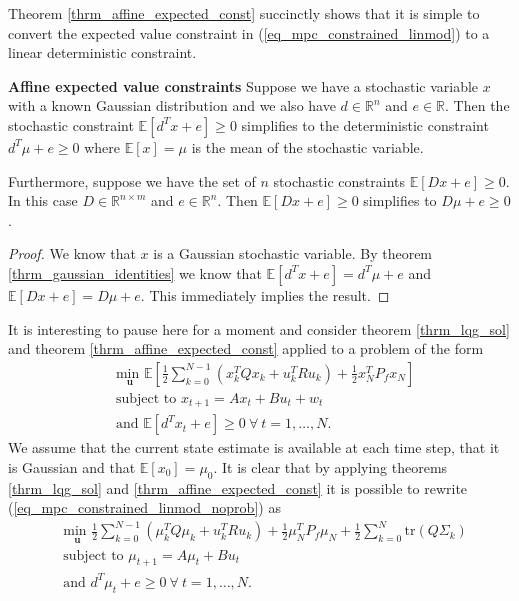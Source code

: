 Theorem \ref{thrm_affine_expected_const} succinctly shows that it is simple to convert the expected value constraint in (\ref{eq_mpc_constrained_linmod}) to a linear deterministic constraint.
\begin{thrm}
\textbf{Affine expected value constraints} Suppose we have a stochastic variable $x$ with a known Gaussian distribution and we also have $d \in \mathbb{R}^{n}$ and $e \in \mathbb{R}$. Then the stochastic constraint $\mathbb{E}[d^Tx + e] \geq 0$ simplifies to the deterministic constraint $d^T\mu + e \geq 0$ where $\mathbb{E}[x]= \mu$ is the mean of the stochastic variable. 

Furthermore, suppose we have the set of $n$ stochastic constraints $\mathbb{E}[Dx + e] \geq 0$. In this case $D \in \mathbb{R}^{n \times m}$ and $e \in \mathbb{R}^n$. Then $\mathbb{E}[Dx + e] \geq 0$ simplifies to $D\mu + e \geq 0$.  
\label{thrm_affine_expected_const}
\end{thrm}
\begin{proof}
We know that $x$ is a Gaussian stochastic variable. By theorem \ref{thrm_gaussian_identities} we know that $\mathbb{E}[d^Tx + e] =d^T\mu + e$ and $\mathbb{E}[Dx + e] = D\mu + e$. This immediately implies the result.
\end{proof}
It is interesting to pause here for a moment and consider theorem \ref{thrm_lqg_sol} and theorem \ref{thrm_affine_expected_const} applied to a problem of the form 
\begin{equation}
\begin{aligned}
&\underset{\mathbf{u}}{\text{min }} \mathbb{E}\left[ \frac{1}{2}\sum_{k=0}^{N-1} \left( x_k^TQx_k + u_k^TRu_k \right) + \frac{1}{2}x_N^TP_fx_N \right] \\
& \text{subject to } x_{t+1}=Ax_t+Bu_t + w_t \\
& \text{and } \mathbb{E}[d^Tx_t + e] \geq 0 ~\forall ~t=1,\hdots,N.
\end{aligned}
\label{eq_mpc_constrained_linmod_noprob}
\end{equation}
We assume that the current state estimate is available at each time step, that it is Gaussian and that $\mathbb{E}[x_0]=\mu_0$. It is clear that by applying theorems \ref{thrm_lqg_sol} and \ref{thrm_affine_expected_const} it is possible to rewrite (\ref{eq_mpc_constrained_linmod_noprob}) as
\begin{equation}
\begin{aligned}
&\underset{\mathbf{u}}{\text{min }} \frac{1}{2}\sum_{k=0}^{N-1} \left( \mu_k^TQ\mu_k + u_k^TRu_k \right) + \frac{1}{2}\mu_N^TP_f\mu_N + \frac{1}{2}\sum_{k=0}^N \text{tr}(Q\Sigma_k) \\
& \text{subject to } \mu_{t+1}=A\mu_t + Bu_t \\
& \text{and } d^T\mu_t + e \geq 0 ~\forall ~t=1,\hdots,N.
\end{aligned}
\label{eq_mpc_constrained_linmod_deter_noprob}
\end{equation}
